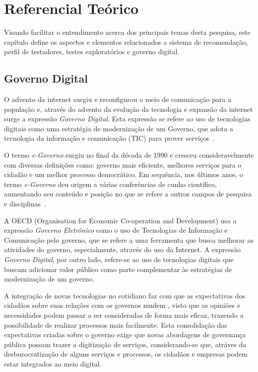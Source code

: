 \chapter[Referencial Teórico]{Referencial Teórico}
Visando facilitar o entendimento acerca dos principais temas desta pesquisa, este capítulo define os aspectos e elementos relacionados a sistema de
recomendação, perfil de testadores, testes exploratórios e governo digital.
\section{Governo Digital}

O advento da internet surgiu e reconfigurou o meio de comunicação para a população e, através do advento da evolução da tecnologia 
e expansão da internet surge a expressão \textit{Governo Digital}. Esta expressão se refere ao uso de tecnologias digitais como uma 
estratégia de modernização de um Governo, que adota a tecnologia da informação e comunicação (TIC) para prover 
serviços~\cite{fang2002government}. 

O termo \textit{e-Governo} surgiu no final da década de 1990 e cresceu consideravelmente com 
diversas definições como: governo mais eficiente, melhores serviços para o cidadão e um melhor processo 
democrático. Em sequência, nos últimos anos, o termo \textit{e-Governo} deu origem a várias conferências de cunho científico, aumentando seu 
conteúdo e posição no que se refere a outros campos de pesquisa e disciplinas~\cite{gronlund2005introducing}.

A OECD (Organisation for Economic Co-operation and Development) usa a expressão \textit {Governo Eletrônico} como o uso de 
Tecnologias de Informação e Comunicação pelo governo, que se refere a uma ferramenta que busca melhorar as atividades do governo, 
especialmente, através do uso da Internet. A expressão \textit{Governo Digital}, por outro lado, refere-se ao uso de tecnologias 
digitais que buscam adicionar valor público como parte complementar às estratégias de modernização de um governo.

A integração de novas tecnologias no cotidiano faz com que as expectativas dos cidadãos sobre suas relações com os governos mudem 
\cite{oecd}, visto que as opiniões e necessidades podem passar a ser consideradas de forma mais eficaz, trazendo a possibilidade 
de realizar processos mais facilmente. Esta consolidação das expectativas criadas sobre o governo exige que novas abordagens de governança pública possam trazer a digitização de serviços,
considerando-se que, atráves da desburocratização de alguns serviços e processos, os cidadãos e empresas podem estar integrados ao
meio digital.

